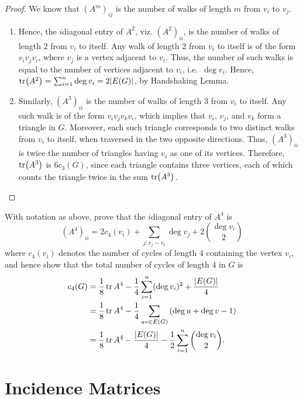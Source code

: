 \begin{proof}
We know that $(A^m)_{ij}$ is the number of walks of length $m$ from $v_i$ to $v_j$.
\begin{enumerate}[label=(\roman*)]
\item Hence, the $i$\nth diagonal entry of $A^2$, viz. $(A^2)_{ii}$, is the number of walks of length $2$ from $v_i$ to itself. Any walk of length $2$ from $v_i$ to itself is of the form $v_i v_j v_i$, where $v_j$ is a vertex adjacent to $v_i$. Thus, the number of such walks is equal to the number of vertices adjacent to $v_i$, i.e.\ $\deg v_i$. Hence, $\tr(A^2) = \sum_{i=1}^n \deg v_i = 2|E(G)|$, by Handshaking Lemma.

\item Similarly, $(A^3)_{ii}$ is the number of walks of length $3$ from $v_i$ to itself. Any such walk is of the form $v_i v_j v_k v_i$, which implies that $v_i$, $v_j$, and $v_k$ form a triangle in $G$. Moreover, each such triangle corresponds to two distinct walks from $v_i$ to itself, when traversed in the two opposite directions. Thus, $(A^3)_{ii}$ is twice the number of triangles having $v_i$ as one of its vertices. Therefore, $\tr(A^3)$ is $6 c_3(G)$, since each triangle contains three vertices, each of which counts the triangle twice in the sum $\tr(A^3)$. \qedhere
\end{enumerate}
\end{proof}

\begin{Exercise}
With notation as above, prove that the $i$\nth diagonal entry of $A^4$ is
\begin{equation*}
	(A^4)_{ii} = 2c_4(v_i) + \sum_{j \colon v_j \sim v_i} \deg v_j + 2 \binom{\deg v_i}{2}
\end{equation*}
where $c_4(v_i)$ denotes the number of cycles of length $4$ containing the vertex $v_i$, and hence show that the total number of cycles of length $4$ in $G$ is
\begin{align*}
	c_4(G) & = \frac 1 8 \tr A^4 - \frac 1 4 \sum_{i=1}^{n} (\deg v_i)^2 + \frac{|E(G)|}{4} \\
	& = \frac 1 8 \tr A^4 - \frac 1 4 \sum_{uv \in E(G)} \pqty{\deg u + \deg v - 1} \\
	& = \frac 1 8 \tr A^4 - \frac {|E(G)|} 4 - \frac 1 2 \sum_{i=1}^n \binom {\deg v_i} 2.
\end{align*}
\end{Exercise}


\section{Incidence Matrices}\label{sec:IncMat}


